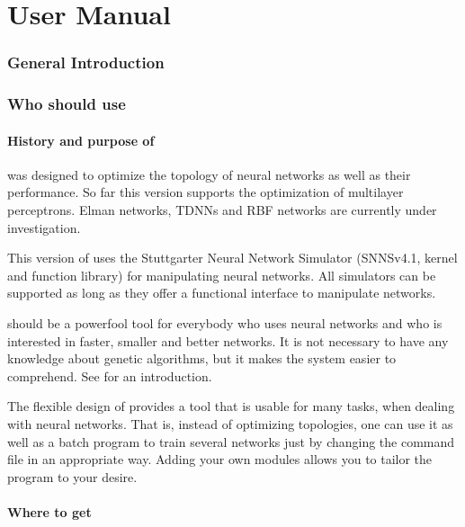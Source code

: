 

\part{\ENZO User Manual} %


\section{General Introduction}



\section{Who should use \ENZO}

\subsection{History and purpose of \ENZO}

\ENZO was designed to optimize the topology of neural networks as well
as their performance. So far this version supports the optimization of
multilayer perceptrons. Elman networks, TDNNs and RBF networks are currently
under investigation. 


This version of \ENZO uses the Stuttgarter Neural Network Simulator (SNNSv4.1,
kernel and function library)
for manipulating neural networks. All simulators can be supported as long
as they offer a functional interface to manipulate networks.

\ENZO should be a powerfool tool for everybody who uses neural networks
and who is interested in faster, smaller and better networks. 
It is not necessary to have any knowledge about genetic algorithms,
but it makes the system easier to comprehend. See \cite{goldberg89,reeves93,schwefel95} for an
introduction.

The flexible design of \ENZO provides a tool that is usable for many tasks, when
dealing with neural networks. That is, instead of optimizing topologies, one can use
it as well as a batch program to train several networks just  by changing the
command file
in an appropriate way. Adding your own modules allows you to tailor the program
to your desire.

\subsection{Where to get \ENZO}

